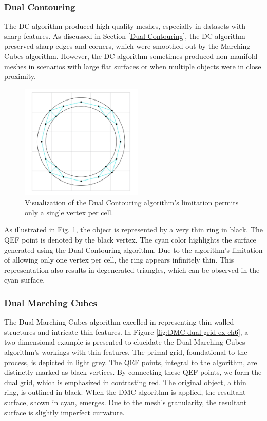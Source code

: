 \subsubsection{Dual Contouring} 
The DC algorithm produced high-quality meshes, especially in datasets with sharp features. As discussed in Section \ref{Dual-Contouring}, the DC algorithm preserved sharp edges and corners, which were smoothed out by the Marching Cubes algorithm. However, the DC algorithm sometimes produced non-manifold meshes in scenarios with large flat surfaces or when multiple objects were in close proximity.
\begin{figure}[h]
    \centering
    \includegraphics[width=0.52\textwidth]{Figures/DC-manifold-example.jpg}
    \decoRule
    \caption{Visualization of the Dual Contouring algorithm's limitation permits only a single vertex per cell.}
    \label{fig:DC-limitation-ch6}
\end{figure}
As illustrated in Fig. \ref{fig:DC-limitation-ch6}, the object is represented by a very thin ring in black. The QEF point is denoted by the black vertex. The cyan color highlights the surface generated using the Dual Contouring algorithm. Due to the algorithm's limitation of allowing only one vertex per cell, the ring appears infinitely thin. This representation also results in degenerated triangles, which can be observed in the cyan surface.

\subsubsection{Dual Marching Cubes} 
The Dual Marching Cubes algorithm excelled in representing thin-walled structures and intricate thin features. In Figure \ref{fig:DMC-dual-grid-ex-ch6}, a two-dimensional example is presented to elucidate the Dual Marching Cubes algorithm's workings with thin features. The primal grid, foundational to the process, is depicted in light grey. The QEF points, integral to the algorithm, are distinctly marked as black vertices. By connecting these QEF points, we form the dual grid, which is emphasized in contrasting red. The original object, a thin ring, is outlined in black. When the DMC algorithm is applied, the resultant surface, shown in cyan, emerges. Due to the mesh's granularity, the resultant surface is slightly imperfect curvature.

